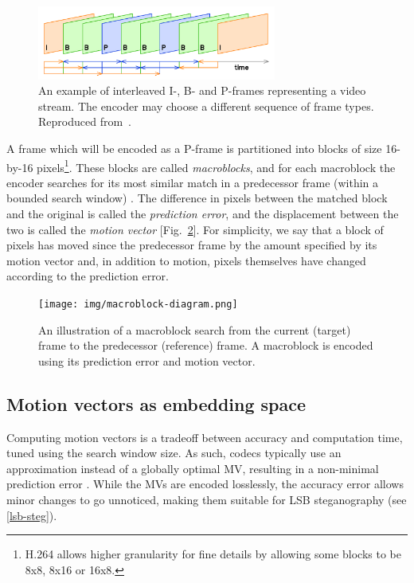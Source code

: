 \documentclass[12pt,british,twoside,notitlepage,usenames,dvipsnames,hypens,final]{report}
\numberwithin{equation}{section}
\numberwithin{figure}{section}
\begin{document}
\begin{figure}[tbh]
\centerline{\includegraphics[width=0.7\textwidth, height=0.7\textheight, keepaspectratio]{img/IPB_images_sequence.png}}
\caption{An example of interleaved I-, B- and P-frames representing a video stream. The encoder may choose a different sequence of frame types. Reproduced from~\cite{interframe-wiki}.}
\label{fig:ipb-seq}
\end{figure}

A frame which will be encoded as a P-frame is partitioned into blocks of size 16-by-16 pixels\footnote{H.264 allows higher granularity for fine details by allowing some blocks to be 8x8, 8x16 or 16x8.}. These blocks are called \emph{macroblocks}, and for each macroblock the encoder searches for its most similar match in a predecessor frame (within a bounded search window) \cite[p.~256]{richardson2004h}. The difference in pixels between the matched block and the original is called the \emph{prediction error}, and the displacement between the two is called the \emph{motion vector} [Fig.~\ref{fig:mb-search}]. For simplicity, we say that a block of pixels has moved since the predecessor frame by the amount specified by its motion vector and, in addition to motion, pixels themselves have changed according to the prediction error.

\begin{figure}[tbh]
\centerline{\texttt{[image: img/macroblock-diagram.png]}}
\caption{An illustration of a macroblock search from the current (target) frame to the predecessor (reference) frame. A macroblock is encoded using its prediction error and  motion vector.}
\label{fig:mb-search}
\end{figure} 

\subsection{Motion vectors as embedding space}

Computing motion vectors is a tradeoff between accuracy and computation time, tuned using the search window size. As such, codecs typically use an approximation instead of a globally optimal MV, resulting in a non-minimal prediction error \cite[p.~257]{richardson2004h}. While the MVs are encoded losslessly, the accuracy error allows minor changes to go unnoticed, making them suitable for LSB steganography (see \ref{lsb-steg}).
\end{document}
